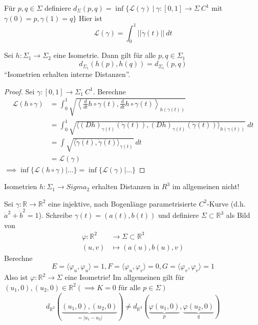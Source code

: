 \documentclass[../main.tex]{subfiles}
\begin{document}
\begin{definition}
    Für $p,q \in \Sigma$ definiere $d_{\Sigma}(p,q)= \inf \{ \mathcal{L}(\gamma) \ | \ \gamma : [0,1]\to \Sigma \ C^1$ mit $\gamma(0)=p, \gamma(1)=q\}$
    Hier ist $$\mathcal{L}(\gamma)=\int _0 ^1 ||\dot{\gamma}(t)|| \ dt$$
\end{definition}

\begin{lemma}
    Sei $h: \Sigma_1 \to \Sigma_2$ eine Isometrie. Dann gilt für alle $p,q \in \Sigma_1$
    $$d_{\Sigma_1}(h(p), h(q))=d_{\Sigma_1}(p,q)$$
    ``Isometrien erhalten interne Distanzen''.
\end{lemma}

\begin{proof}
    Sei $\gamma:[0,1]\to \Sigma_1 \ C^1$. Berechne
    \begin{align*}
        \mathcal{L}(h \circ \gamma) &= \int _0 ^1 \sqrt{\left\langle \frac{d}{dt}h\circ \gamma (t), \frac{d}{dt}h\circ \gamma (t) \right\rangle _{h(\gamma(t))}} \\
        &= \int _0 ^1 \sqrt{\langle (Dh)_{\gamma (t)}(\dot{\gamma}(t)), (Dh)_{\gamma (t)}(\dot{\gamma}(t)) \rangle _{h(\gamma(t))}} \ dt \\
        &= \int \sqrt{\langle \dot{\gamma}(t), \dot{\gamma}(t) \rangle _{\gamma(t)}} \ dt \\
        &= \mathcal{L}(\gamma)
    \end{align*}
    $\implies \inf \{ \mathcal{L}(h \circ \gamma) | \dots \} = \inf \{ \mathcal{L}(\gamma) | \dots \} $
\end{proof}

\begin{remark}
    Isometrien $h: \Sigma_1 \to Sigma_2$ erhalten Distanzen in $R^3$ im allgemeinen nicht!
\end{remark}
\begin{example}
    Sei $\gamma : \mathbb{R} \to \mathbb{R}^2$ eine injektive, nach Bogenlänge parametrisierte $C^2$-Kurve (d.h. $\dot{a}^2+\dot{b}^2=1$).
    Schreibe $\gamma(t)=(a(t),b(t))$ und definiere $\Sigma \subset \mathbb{R}^3$ als Bild von
    \begin{align*}
        \varphi : \mathbb{R}^2 &\to \Sigma \subset \mathbb{R}^3 \\
        (u,v) &\mapsto (a(u),b(u),v)
    \end{align*}
    Berechne $$E=\langle \varphi_u, \varphi_u \rangle = 1, F=\langle \varphi_u, \varphi_v \rangle = 0, G=\langle \varphi_v, \varphi_v \rangle = 1$$
    Also ist $\varphi : \mathbb{R}^2 \to \Sigma$ eine Isometrie! Im allgemeinen gilt für $(u_1,0),(u_2,0)\in \mathbb{R}^2 (\implies K=0 \text{ für alle } p \in \Sigma)$
    $$d_{\mathbb{R}^2}(\underbrace{(u_1, 0), (u_2, 0)}_{=|u_1 - u_2|}) \not = d_{\mathbb{R}^3}(\underbrace{\varphi(u_1,0)}_{p},\underbrace{\varphi(u_2,0)}_{q})$$
\end{example}
\end{document}
